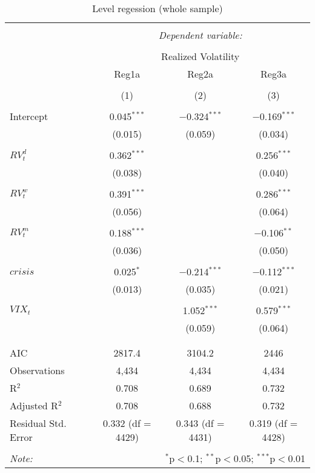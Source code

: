 
\begin{table}[!htbp] \centering 
  \caption{Level regession (whole sample)} 
  \label{} 
\begin{tabular}{@{\extracolsep{5pt}}lccc} 
\\[-1.8ex]\hline 
\hline \\[-1.8ex] 
 & \multicolumn{3}{c}{\textit{Dependent variable:}} \\ 
\cline{2-4} 
\\[-1.8ex] & \multicolumn{3}{c}{Realized Volatility} \\ 
 & Reg1a & Reg2a & Reg3a \\ 
\\[-1.8ex] & (1) & (2) & (3)\\ 
\hline \\[-1.8ex] 
 Intercept & 0.045$^{***}$ & $-$0.324$^{***}$ & $-$0.169$^{***}$ \\ 
  & (0.015) & (0.059) & (0.034) \\ 
  & & & \\ 
 $RV^{d}_{t}$ & 0.362$^{***}$ &  & 0.256$^{***}$ \\ 
  & (0.038) &  & (0.040) \\ 
  & & & \\ 
 $RV^{w}_{t}$ & 0.391$^{***}$ &  & 0.286$^{***}$ \\ 
  & (0.056) &  & (0.064) \\ 
  & & & \\ 
 $RV^{m}_{t}$ & 0.188$^{***}$ &  & $-$0.106$^{**}$ \\ 
  & (0.036) &  & (0.050) \\ 
  & & & \\ 
 $crisis$ & 0.025$^{*}$ & $-$0.214$^{***}$ & $-$0.112$^{***}$ \\ 
  & (0.013) & (0.035) & (0.021) \\ 
  & & & \\ 
 $VIX_{t}$ &  & 1.052$^{***}$ & 0.579$^{***}$ \\ 
  &  & (0.059) & (0.064) \\ 
  & & & \\ 
\hline \\[-1.8ex] 
AIC & 2817.4 & 3104.2 & 2446 \\ 
Observations & 4,434 & 4,434 & 4,434 \\ 
R$^{2}$ & 0.708 & 0.689 & 0.732 \\ 
Adjusted R$^{2}$ & 0.708 & 0.688 & 0.732 \\ 
Residual Std. Error & 0.332 (df = 4429) & 0.343 (df = 4431) & 0.319 (df = 4428) \\ 
\hline 
\hline \\[-1.8ex] 
\textit{Note:}  & \multicolumn{3}{r}{$^{*}$p$<$0.1; $^{**}$p$<$0.05; $^{***}$p$<$0.01} \\ 
\end{tabular} 
\end{table} 
